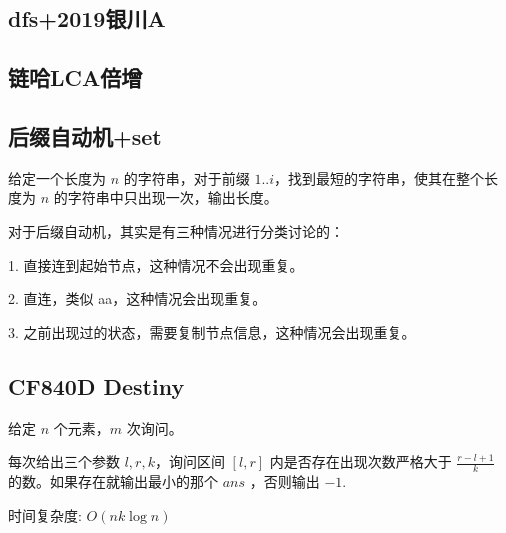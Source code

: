 \documentclass[twoside,a4paper]{article}
\begin{document}
\subsection{dfs+2019银川A}


\subsection{链哈LCA倍增}


\subsection{后缀自动机+set}
给定一个长度为 $n$ 的字符串，对于前缀 $1..i$，找到最短的字符串，使其在整个长度为 $n$ 的字符串中只出现一次，输出长度。 \par
对于后缀自动机，其实是有三种情况进行分类讨论的：\par
1. 直接连到起始节点，这种情况不会出现重复。 \par
2. 直连，类似 aa，这种情况会出现重复。 \par
3. 之前出现过的状态，需要复制节点信息，这种情况会出现重复。 \par


\subsection{CF840D Destiny}
给定 $n$ 个元素，$m$ 次询问。 \par
每次给出三个参数 $l,r,k$，询问区间 $[l,r]$ 内是否存在出现次数严格大于 $\frac{r-l+1}{k}$ 的数。如果存在就输出最小的那个 $ans$ ，否则输出 $-1$. \par
时间复杂度: $O(nk \log n)$

\end{document}
